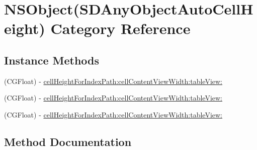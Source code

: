 \hypertarget{category_n_s_object_07_s_d_any_object_auto_cell_height_08}{}\section{N\+S\+Object(S\+D\+Any\+Object\+Auto\+Cell\+Height) Category Reference}
\label{category_n_s_object_07_s_d_any_object_auto_cell_height_08}
\subsection*{Instance Methods}
\begin{DoxyCompactItemize}
\item 
(C\+G\+Float) -\/ \mbox{\hyperlink{category_n_s_object_07_s_d_any_object_auto_cell_height_08_aa618c83e951010f546ea1f085eae72c7}{cell\+Height\+For\+Index\+Path\+:cell\+Content\+View\+Width\+:table\+View\+:}}
\item 
(C\+G\+Float) -\/ \mbox{\hyperlink{category_n_s_object_07_s_d_any_object_auto_cell_height_08_aa618c83e951010f546ea1f085eae72c7}{cell\+Height\+For\+Index\+Path\+:cell\+Content\+View\+Width\+:table\+View\+:}}
\item 
(C\+G\+Float) -\/ \mbox{\hyperlink{category_n_s_object_07_s_d_any_object_auto_cell_height_08_aa618c83e951010f546ea1f085eae72c7}{cell\+Height\+For\+Index\+Path\+:cell\+Content\+View\+Width\+:table\+View\+:}}
\end{DoxyCompactItemize}


\subsection{Method Documentation}
\mbox{\label{category_n_s_object_07_s_d_any_object_auto_cell_height_08_aa618c83e951010f546ea1f085eae72c7}} 
